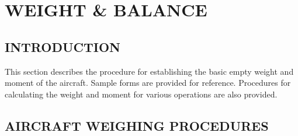 \chapter{WEIGHT \& BALANCE}
\vspace{\minitocspacebefore}
\minitoc
\cleardoublepage

\section{INTRODUCTION}
This section describes the procedure for establishing the basic empty weight and moment of 
the aircraft.  Sample forms are provided for reference.  Procedures for calculating the 
weight and moment for various operations are also provided.  

\section{AIRCRAFT WEIGHING PROCEDURES}

